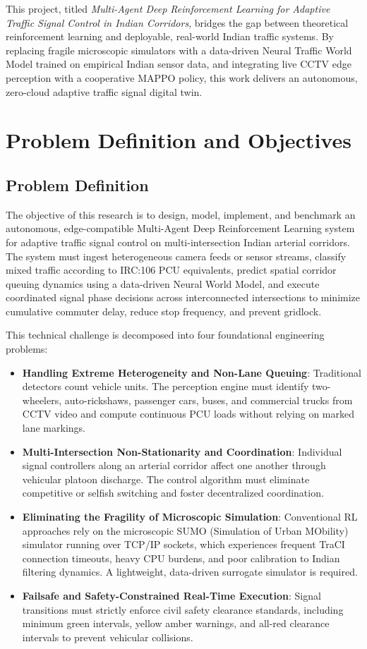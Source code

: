 This project, titled \textit{Multi-Agent Deep Reinforcement Learning for Adaptive Traffic Signal Control in Indian Corridors}, bridges the gap between theoretical reinforcement learning and deployable, real-world Indian traffic systems. By replacing fragile microscopic simulators with a data-driven Neural Traffic World Model trained on empirical Indian sensor data, and integrating live CCTV edge perception with a cooperative MAPPO policy, this work delivers an autonomous, zero-cloud adaptive traffic signal digital twin.

\section{Problem Definition and Objectives}
\label{sec:problem_def_obj}

\subsection{Problem Definition}
The objective of this research is to design, model, implement, and benchmark an autonomous, edge-compatible Multi-Agent Deep Reinforcement Learning system for adaptive traffic signal control on multi-intersection Indian arterial corridors. The system must ingest heterogeneous camera feeds or sensor streams, classify mixed traffic according to IRC:106 PCU equivalents, predict spatial corridor queuing dynamics using a data-driven Neural World Model, and execute coordinated signal phase decisions across interconnected intersections to minimize cumulative commuter delay, reduce stop frequency, and prevent gridlock.

This technical challenge is decomposed into four foundational engineering problems:
\begin{itemize}
    \item \textbf{Handling Extreme Heterogeneity and Non-Lane Queuing}: Traditional detectors count vehicle units. The perception engine must identify two-wheelers, auto-rickshaws, passenger cars, buses, and commercial trucks from CCTV video and compute continuous PCU loads without relying on marked lane markings.
    \item \textbf{Multi-Intersection Non-Stationarity and Coordination}: Individual signal controllers along an arterial corridor affect one another through vehicular platoon discharge. The control algorithm must eliminate competitive or selfish switching and foster decentralized coordination.
    \item \textbf{Eliminating the Fragility of Microscopic Simulation}: Conventional RL approaches rely on the microscopic SUMO (Simulation of Urban MObility) simulator running over TCP/IP sockets, which experiences frequent TraCI connection timeouts, heavy CPU burdens, and poor calibration to Indian filtering dynamics. A lightweight, data-driven surrogate simulator is required.
    \item \textbf{Failsafe and Safety-Constrained Real-Time Execution}: Signal transitions must strictly enforce civil safety clearance standards, including minimum green intervals, yellow amber warnings, and all-red clearance intervals to prevent vehicular collisions.
\end{itemize}

